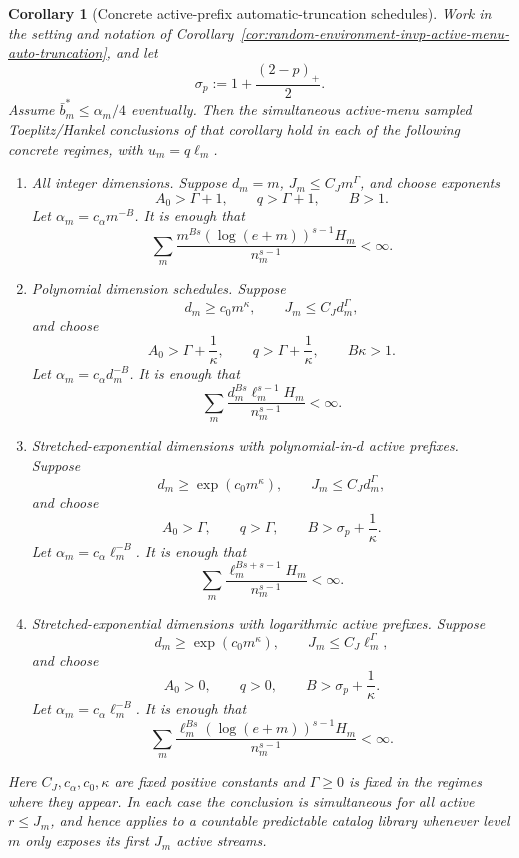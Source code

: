 \documentclass[11pt]{amsart}
\numberwithin{equation}{section}
\newtheorem{corollary}[theorem]{Corollary}
\theoremstyle{definition}
\theoremstyle{remark}
\begin{document}
\begin{corollary}[Concrete active-prefix automatic-truncation schedules]
\label{cor:random-environment-invp-active-prefix-schedules}
Work in the setting and notation of
Corollary~\ref{cor:random-environment-invp-active-menu-auto-truncation}, and
let
\[
  \sigma_p:=1+\frac{(2-p)_+}{2}.
\]
Assume \(\bar b_m^*\le\alpha_m/4\) eventually.  Then the simultaneous
active-menu sampled Toeplitz/Hankel conclusions of that corollary hold in each
of the following concrete regimes, with \(u_m=q\ell_m\).

\begin{enumerate}[label=\textup{(\roman*)},leftmargin=2.2em]
\item All integer dimensions.  Suppose \(d_m=m\), \(J_m\le C_Jm^\Gamma\), and
choose exponents
\[
  A_0>\Gamma+1,\qquad q>\Gamma+1,\qquad B>1 .
\]
Let \(\alpha_m=c_\alpha m^{-B}\).  It is enough that
\[
  \sum_m
  \frac{m^{Bs}(\log(e+m))^{s-1}H_m}{n_m^{s-1}}<\infty .
\]

\item Polynomial dimension schedules.  Suppose
\[
  d_m\ge c_0m^\kappa,\qquad J_m\le C_Jd_m^\Gamma ,
\]
and choose
\[
  A_0>\Gamma+\frac1\kappa,\qquad
  q>\Gamma+\frac1\kappa,\qquad
  B\kappa>1 .
\]
Let \(\alpha_m=c_\alpha d_m^{-B}\).  It is enough that
\[
  \sum_m
  \frac{d_m^{Bs}\ell_m^{s-1}H_m}{n_m^{s-1}}<\infty .
\]

\item Stretched-exponential dimensions with polynomial-in-\(d\) active
prefixes.  Suppose
\[
  d_m\ge\exp(c_0m^\kappa),\qquad J_m\le C_Jd_m^\Gamma ,
\]
and choose
\[
  A_0>\Gamma,\qquad q>\Gamma,\qquad
  B>\sigma_p+\frac1\kappa .
\]
Let \(\alpha_m=c_\alpha\ell_m^{-B}\).  It is enough that
\[
  \sum_m
  \frac{\ell_m^{Bs+s-1}H_m}{n_m^{s-1}}<\infty .
\]

\item Stretched-exponential dimensions with logarithmic active prefixes.
Suppose
\[
  d_m\ge\exp(c_0m^\kappa),\qquad J_m\le C_J\ell_m^\Gamma ,
\]
and choose
\[
  A_0>0,\qquad q>0,\qquad
  B>\sigma_p+\frac1\kappa .
\]
Let \(\alpha_m=c_\alpha\ell_m^{-B}\).  It is enough that
\[
  \sum_m
  \frac{\ell_m^{Bs}(\log(e+m))^{s-1}H_m}{n_m^{s-1}}<\infty .
\]
\end{enumerate}
Here \(C_J,c_\alpha,c_0,\kappa\) are fixed positive constants and
\(\Gamma\ge0\) is fixed in the regimes where they appear.  In each case the
conclusion is simultaneous for all active \(r\le J_m\), and hence applies to a
countable predictable catalog library whenever level \(m\) only exposes its
first \(J_m\) active streams.
\end{corollary}
\end{document}
